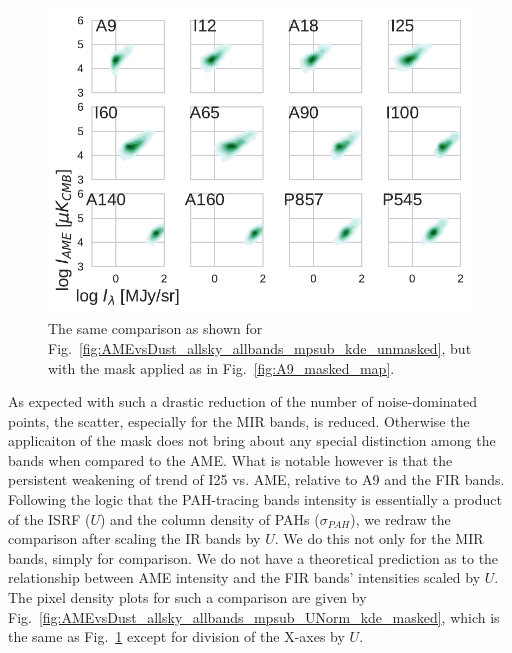             \begin{figure}
              \includegraphics[width=\textwidth]{../Plots/ch_allsky/AMEvsDust_allsky_allbands_mpsub_kde_masked.pdf}
              \centering
              \caption{The same comparison as shown for Fig.~\ref{fig:AMEvsDust_allsky_allbands_mpsub_kde_unmasked}, but with the mask applied as in Fig.~\ref{fig:A9_masked_map}.}
              \label{fig:AMEvsDust_allsky_allbands_mpsub_kde_masked}
            \end{figure}
          As expected with such a drastic reduction of the number of noise-dominated points, the scatter, especially for the MIR bands, is reduced. Otherwise the applicaiton of the mask does not bring about any special distinction among the bands when compared to the AME. What is notable however is that the persistent weakening of trend of I25 vs. AME, relative to A9 and the FIR bands. Following the logic that the PAH-tracing bands intensity is essentially a product of the ISRF ($U$) and the column density of PAHs ($\sigma_{PAH}$), we redraw the comparison after scaling the IR bands by $U$. We do this not only for the MIR bands, simply for comparison. We do not have a theoretical prediction as to the relationship between AME intensity and the FIR bands' intensities scaled by $U$. The pixel density plots for such a comparison are given by Fig.~\ref{fig:AMEvsDust_allsky_allbands_mpsub_UNorm_kde_masked}, which is the same as Fig.~\ref{fig:AMEvsDust_allsky_allbands_mpsub_kde_masked} except for division of the X-axes by $U$.
